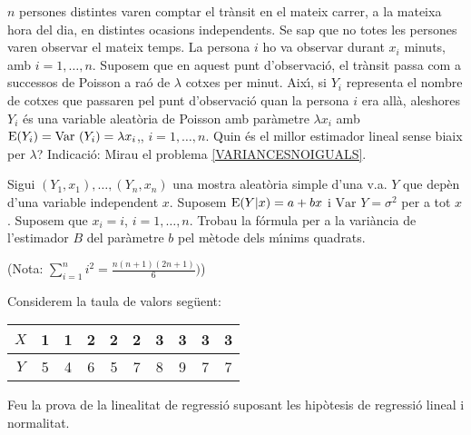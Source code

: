 \begin{prob}
{$n$ persones distintes varen comptar el tr\`ansit en el mateix carrer, a 
la mateixa hora del dia, en distintes ocasions independents. Se sap que 
no totes les persones varen observar el mateix temps. La persona $i$ 
ho va observar durant $x_i$ minuts, amb \mbox{$i=1,\ldots,n$.} Suposem
que en aquest punt d'observaci\'o, el tr\`ansit passa com a successos
de Poisson a ra\'o de $\lambda$ cotxes per minut. Aix\'{\i}, si $Y_i$ 
representa el nombre de cotxes que passaren pel punt d'observaci\'o 
quan la persona $i$ era all\`a, aleshores $Y_i$ \'es una variable 
aleat\`oria de Poisson amb par\`ametre $\lambda x_i$ amb 
\mbox{${\rm E} (Y_i)=\mbox{Var } (Y_i)=\lambda x_i$,}, \mbox{$i=1,\ldots,n$.}
Quin \'es el millor estimador lineal sense biaix per $\lambda$?\newline
{\footnotesize Indicaci\'o: Mirau el problema \ref{VARIANCESNOIGUALS}.}}
\end{prob}

\newpage

\begin{prob}
{
Sigui $(Y_1,x_1),\ldots,(Y_n,x_n)$ una mostra aleat\`oria simple 
d'una v.a. $Y$ que dep\`en d'una variable independent $x$. Suposem
${\rm E} (Y|x)=a +b x$ i $\mbox{Var }Y=\sigma^2$ per a tot $x$. Suposem que $x_i =i$,
$i=1,\ldots,n$. Trobau la f\'ormula per a la  
vari\`ancia de l'estimador $B$ del par\`ametre $b$ pel m\`etode dels
m\'{\i}nims quadrats.

(Nota: $\sum\limits_{i=1}^n i^2 =\frac{n(n+1)(2n+1)}{6})$)
}
\end{prob}

\begin{prob}
{
Considerem la taula de valors seg\"uent:
\begin{center}
\begin{tabular}{|c|ccccccccc|}
\hline
$X$&1&1&2&2&2&3&3&3&3\\\hline
$Y$&5&4&6&5&7&8&9&7&7\\\hline
\end{tabular}
\end{center}
Feu la prova de la linealitat de regressi\'o suposant les hip\`otesis de 
regressi\'o lineal i normalitat.
}
\end{prob}

